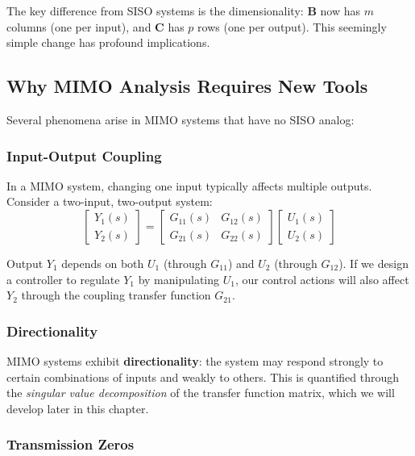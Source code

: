 The key difference from SISO systems is the dimensionality: $\mathbf{B}$ now has $m$ columns (one per input), and $\mathbf{C}$ has $p$ rows (one per output). This seemingly simple change has profound implications.

\subsection{Why MIMO Analysis Requires New Tools}

Several phenomena arise in MIMO systems that have no SISO analog:

\subsubsection{Input-Output Coupling}

In a MIMO system, changing one input typically affects multiple outputs. Consider a two-input, two-output system:
\begin{equation}
\begin{bmatrix} Y_1(s) \\ Y_2(s) \end{bmatrix} = \begin{bmatrix} G_{11}(s) & G_{12}(s) \\ G_{21}(s) & G_{22}(s) \end{bmatrix} \begin{bmatrix} U_1(s) \\ U_2(s) \end{bmatrix}
\end{equation}

Output $Y_1$ depends on both $U_1$ (through $G_{11}$) and $U_2$ (through $G_{12}$). If we design a controller to regulate $Y_1$ by manipulating $U_1$, our control actions will also affect $Y_2$ through the coupling transfer function $G_{21}$.

\subsubsection{Directionality}

MIMO systems exhibit \textbf{directionality}: the system may respond strongly to certain combinations of inputs and weakly to others. This is quantified through the \textit{singular value decomposition} of the transfer function matrix, which we will develop later in this chapter.

\subsubsection{Transmission Zeros}

